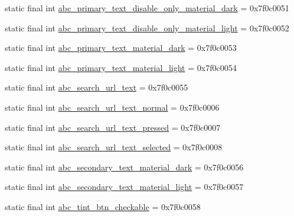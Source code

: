 \begin{CompactItemize}
\item 
static final int \hyperlink{classandroid_1_1support_1_1graphics_1_1drawable_1_1animated_1_1_r_1_1color_8c17a6a2b0eddcdade9bbe2cd11027e1}{abc\_\-primary\_\-text\_\-disable\_\-only\_\-material\_\-dark} = 0x7f0c0051
\item 
static final int \hyperlink{classandroid_1_1support_1_1graphics_1_1drawable_1_1animated_1_1_r_1_1color_e72d3ac3ec7437f5e0f9bb0ed75d5d02}{abc\_\-primary\_\-text\_\-disable\_\-only\_\-material\_\-light} = 0x7f0c0052
\item 
static final int \hyperlink{classandroid_1_1support_1_1graphics_1_1drawable_1_1animated_1_1_r_1_1color_a8824f20f66c38902762d3c5d86c0b23}{abc\_\-primary\_\-text\_\-material\_\-dark} = 0x7f0c0053
\item 
static final int \hyperlink{classandroid_1_1support_1_1graphics_1_1drawable_1_1animated_1_1_r_1_1color_2ade18bc47ac2bd426de54148eab24ad}{abc\_\-primary\_\-text\_\-material\_\-light} = 0x7f0c0054
\item 
static final int \hyperlink{classandroid_1_1support_1_1graphics_1_1drawable_1_1animated_1_1_r_1_1color_4f3a3a30770181df36e67e4d62692537}{abc\_\-search\_\-url\_\-text} = 0x7f0c0055
\item 
static final int \hyperlink{classandroid_1_1support_1_1graphics_1_1drawable_1_1animated_1_1_r_1_1color_9c766ec9507e9584cc1b152c20b362ca}{abc\_\-search\_\-url\_\-text\_\-normal} = 0x7f0c0006
\item 
static final int \hyperlink{classandroid_1_1support_1_1graphics_1_1drawable_1_1animated_1_1_r_1_1color_a7638178a1ab294eb1b35dca9eb4bb5f}{abc\_\-search\_\-url\_\-text\_\-pressed} = 0x7f0c0007
\item 
static final int \hyperlink{classandroid_1_1support_1_1graphics_1_1drawable_1_1animated_1_1_r_1_1color_8a83b0f92d91351660b3f04d2f1ec458}{abc\_\-search\_\-url\_\-text\_\-selected} = 0x7f0c0008
\item 
static final int \hyperlink{classandroid_1_1support_1_1graphics_1_1drawable_1_1animated_1_1_r_1_1color_25fb0a1662fe5d84f8bab97cda291f62}{abc\_\-secondary\_\-text\_\-material\_\-dark} = 0x7f0c0056
\item 
static final int \hyperlink{classandroid_1_1support_1_1graphics_1_1drawable_1_1animated_1_1_r_1_1color_4eb601648f6c94dbb2298f463bb443b6}{abc\_\-secondary\_\-text\_\-material\_\-light} = 0x7f0c0057
\item 
static final int \hyperlink{classandroid_1_1support_1_1graphics_1_1drawable_1_1animated_1_1_r_1_1color_87c373639513f09809c66d8a84843d42}{abc\_\-tint\_\-btn\_\-checkable} = 0x7f0c0058

\end{CompactItemize}
